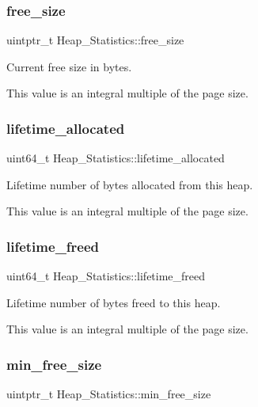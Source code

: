 \subsubsection{\texorpdfstring{free\_size}{free\_size}}
{\footnotesize\ttfamily uintptr\+\_\+t Heap\+\_\+\+Statistics\+::free\+\_\+size}



Current free size in bytes. 

This value is an integral multiple of the page size. \mbox{\label{structHeap__Statistics_a511f505d0322a9217c82a5ef84e91900}} 
\subsubsection{\texorpdfstring{lifetime\_allocated}{lifetime\_allocated}}
{\footnotesize\ttfamily uint64\+\_\+t Heap\+\_\+\+Statistics\+::lifetime\+\_\+allocated}



Lifetime number of bytes allocated from this heap. 

This value is an integral multiple of the page size. \mbox{\label{structHeap__Statistics_a3b6ed31e7d4ef8b250ab5befc0cdcac9}} 
\subsubsection{\texorpdfstring{lifetime\_freed}{lifetime\_freed}}
{\footnotesize\ttfamily uint64\+\_\+t Heap\+\_\+\+Statistics\+::lifetime\+\_\+freed}



Lifetime number of bytes freed to this heap. 

This value is an integral multiple of the page size. \mbox{\label{structHeap__Statistics_a590447e1582848eafb05821a0d0e794a}} 
\subsubsection{\texorpdfstring{min\_free\_size}{min\_free\_size}}
{\footnotesize\ttfamily uintptr\+\_\+t Heap\+\_\+\+Statistics\+::min\+\_\+free\+\_\+size}



